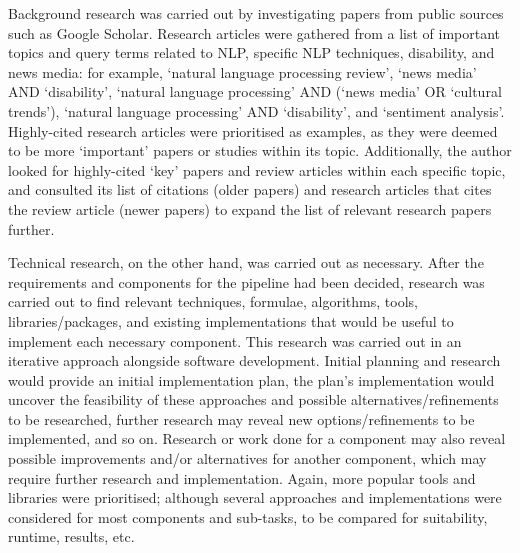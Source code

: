 \documentclass{report}
\begin{document}
Background research was carried out by investigating papers from public sources such as Google Scholar.
Research articles were gathered from a list of important topics and query terms related to NLP, specific NLP techniques, disability, and news media: for example, `natural language processing review', `news media' AND `disability', `natural language processing' AND (`news media' OR `cultural trends'), `natural language processing' AND `disability', and `sentiment analysis'.
Highly-cited research articles were prioritised as examples, as they were deemed to be more `important' papers or studies within its topic.
Additionally, the author looked for highly-cited `key' papers and review articles within each specific topic, and consulted its list of citations (older papers) and research articles that cites the review article (newer papers) to expand the list of relevant research papers further.

Technical research, on the other hand, was carried out as necessary.
After the requirements and components for the pipeline had been decided, research was carried out to find relevant techniques, formulae, algorithms, tools, libraries/packages, and existing implementations that would be useful to implement each necessary component.
This research was carried out in an iterative approach alongside software development. 
Initial planning and research would provide an initial implementation plan, the plan's implementation would uncover the feasibility of these approaches and possible alternatives/refinements to be researched, further research may reveal new options/refinements to be implemented, and so on.
Research or work done for a component may also reveal possible improvements and/or alternatives for another component, which may require further research and implementation.  
Again, more popular tools and libraries were prioritised; although several approaches and implementations were considered for most components and sub-tasks, to be compared for suitability, runtime, results, etc.
\end{document}
